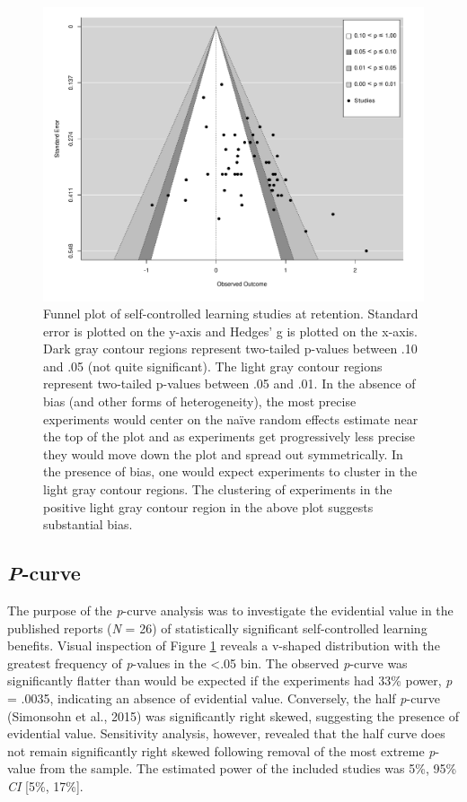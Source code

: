 \documentclass[
  english,
  man, donotrepeattitle,floatsintext]{apa7}
\begin{document}
\begin{figure}

{\centering \includegraphics{../../figs/fig4} 

}

\caption{Funnel plot of self-controlled learning studies at retention. Standard error is plotted on the y-axis and Hedges' g is plotted on the x-axis. Dark gray contour regions represent two-tailed p-values between .10 and .05 (not quite significant). The light gray contour regions represent two-tailed p-values between .05 and .01. In the absence of bias (and other forms of heterogeneity), the most precise experiments would center on the naïve random effects estimate near the top of the plot and as experiments get progressively less precise they would move down the plot and spread out symmetrically. In the presence of bias, one would expect experiments to cluster in the light gray contour regions. The clustering of experiments in the positive light gray contour region in the above plot suggests substantial bias.}\label{fig:fig4}
\end{figure}

\hypertarget{p-curve}{%
\subsection{\texorpdfstring{\emph{P}-curve}{P-curve}}\label{p-curve}}

The purpose of the \emph{p}-curve analysis was to investigate the evidential value in the published reports (\emph{N} = 26) of statistically significant self-controlled learning benefits. Visual inspection of Figure \ref{fig:fig4} reveals a v-shaped distribution with the greatest frequency of \emph{p}-values in the \textless.05 bin. The observed \emph{p}-curve was significantly flatter than would be expected if the experiments had 33\% power, \emph{p} = .0035, indicating an absence of evidential value. Conversely, the half \emph{p}-curve (Simonsohn et al., 2015) was significantly right skewed, suggesting the presence of evidential value. Sensitivity analysis, however, revealed that the half curve does not remain significantly right skewed following removal of the most extreme \emph{p}-value from the sample. The estimated power of the included studies was 5\%, 95\% \emph{CI} {[}5\%, 17\%{]}.
\end{document}
